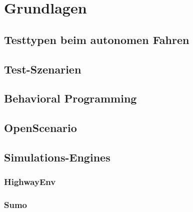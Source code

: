 \chapter{Grundlagen}

\section{Testtypen beim autonomen Fahren}
\section{Test-Szenarien}
\section{Behavioral Programming}
\section{OpenScenario}
\section{Simulations-Engines}
\subsection{HighwayEnv}
\subsection{Sumo}

